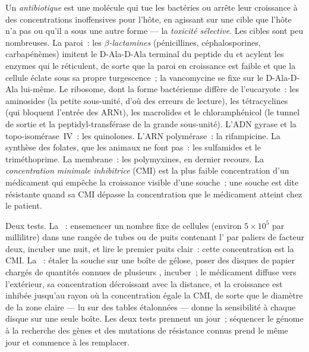 \begin{definition}\label{def:b3:bacteriology:antibiotics}
Un \emph{antibiotique} est une molécule qui tue les bactéries ou arrête
leur croissance à des concentrations inoffensives pour l'hôte, en
agissant sur une cible que l'hôte n'a pas ou qu'il a sous une autre
forme --- la \emph{toxicité sélective}. Les cibles sont peu
nombreuses. La paroi~: les \emph{$\beta$-lactamines} (pénicillines,
céphalosporines, carbapénèmes) imitent le D-Ala-D-Ala terminal du
peptide du  et acylent les enzymes qui le réticulent, de
sorte que la paroi en croissance est faible et que la cellule éclate
sous sa propre turgescence~; la vancomycine se fixe sur le D-Ala-D-Ala
lui-même. Le ribosome, dont la forme bactérienne diffère de
l'eucaryote~: les aminosides (la petite sous-unité, d'où des erreurs de
lecture), les tétracyclines (qui bloquent l'entrée des ARNt), les
macrolides et le chloramphénicol (le tunnel de sortie et la
peptidyl-transférase de la grande sous-unité). L'ADN gyrase et la
topo-isomérase~IV~: les quinolones. L'ARN polymérase~: la rifampicine.
La synthèse des folates, que les animaux ne font pas~: les sulfamides
et le triméthoprime. La membrane~: les polymyxines, en dernier
recours. La \emph{concentration minimale inhibitrice} (CMI) est la plus
faible concentration d'un médicament qui empêche la croissance visible
d'une souche~; une souche est dite résistante quand sa CMI dépasse la
concentration que le médicament atteint chez le patient.
\end{definition}

\begin{method}\label{met:b3:bacteriology:mic}
Deux tests. La \emph{}~: ensemencer un nombre fixe
de cellules (environ $5\times 10^{5}$ par millilitre) dans une rangée
de tubes ou de puits contenant l' par paliers de facteur
deux, incuber une nuit, et lire le premier puits clair~: cette
concentration est la CMI. La \emph{}~: étaler la
souche sur une boîte de gélose, poser des disques de papier chargés de
quantités connues de plusieurs , incuber~; le médicament
diffuse vers l'extérieur, sa concentration décroissant avec la
distance, et la croissance est inhibée jusqu'au rayon où la
concentration égale la CMI, de sorte que le diamètre de la zone claire
--- lu sur des tables étalonnées --- donne la sensibilité à chaque
disque sur une seule boîte. Les deux tests prennent un jour~; séquencer
le génome à la recherche des gènes et des mutations de résistance
connus prend le même jour et commence à les remplacer.
\end{method}

